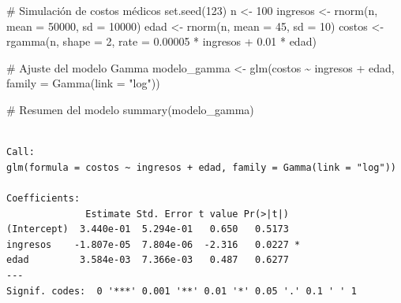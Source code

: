 \documentclass[
  letterpaper,
  DIV=11,
  numbers=noendperiod]{scrreprt}
\newenvironment{Shaded}{\begin{snugshade}}{\end{snugshade}}
\newcommand{\AttributeTok}[1]{\textcolor[rgb]{0.40,0.45,0.13}{#1}}
\newcommand{\CommentTok}[1]{\textcolor[rgb]{0.37,0.37,0.37}{#1}}
\newcommand{\DecValTok}[1]{\textcolor[rgb]{0.68,0.00,0.00}{#1}}
\newcommand{\FloatTok}[1]{\textcolor[rgb]{0.68,0.00,0.00}{#1}}
\newcommand{\FunctionTok}[1]{\textcolor[rgb]{0.28,0.35,0.67}{#1}}
\newcommand{\NormalTok}[1]{\textcolor[rgb]{0.00,0.23,0.31}{#1}}
\newcommand{\OtherTok}[1]{\textcolor[rgb]{0.00,0.23,0.31}{#1}}
\newcommand{\SpecialCharTok}[1]{\textcolor[rgb]{0.37,0.37,0.37}{#1}}
\newcommand{\StringTok}[1]{\textcolor[rgb]{0.13,0.47,0.30}{#1}}
\begin{document}
\begin{tcolorbox}[enhanced jigsaw, leftrule=.75mm, breakable, colbacktitle=quarto-callout-tip-color!10!white, bottomrule=.15mm, colframe=quarto-callout-tip-color-frame, toprule=.15mm, colback=white, coltitle=black, bottomtitle=1mm, left=2mm, title=\textcolor{quarto-callout-tip-color}{\faLightbulb}\hspace{0.5em}{Ejemplo}, opacityback=0, arc=.35mm, opacitybacktitle=0.6, toptitle=1mm, titlerule=0mm, rightrule=.15mm]

\begin{Shaded}
\begin{Highlighting}[]
\CommentTok{\# Simulación de costos médicos}
\FunctionTok{set.seed}\NormalTok{(}\DecValTok{123}\NormalTok{)}
\NormalTok{n }\OtherTok{\textless{}{-}} \DecValTok{100}
\NormalTok{ingresos }\OtherTok{\textless{}{-}} \FunctionTok{rnorm}\NormalTok{(n, }\AttributeTok{mean =} \DecValTok{50000}\NormalTok{, }\AttributeTok{sd =} \DecValTok{10000}\NormalTok{)}
\NormalTok{edad }\OtherTok{\textless{}{-}} \FunctionTok{rnorm}\NormalTok{(n, }\AttributeTok{mean =} \DecValTok{45}\NormalTok{, }\AttributeTok{sd =} \DecValTok{10}\NormalTok{)}
\NormalTok{costos }\OtherTok{\textless{}{-}} \FunctionTok{rgamma}\NormalTok{(n, }\AttributeTok{shape =} \DecValTok{2}\NormalTok{, }\AttributeTok{rate =} \FloatTok{0.00005} \SpecialCharTok{*}\NormalTok{ ingresos }\SpecialCharTok{+} \FloatTok{0.01} \SpecialCharTok{*}\NormalTok{ edad)}

\CommentTok{\# Ajuste del modelo Gamma}
\NormalTok{modelo\_gamma }\OtherTok{\textless{}{-}} \FunctionTok{glm}\NormalTok{(costos }\SpecialCharTok{\textasciitilde{}}\NormalTok{ ingresos }\SpecialCharTok{+}\NormalTok{ edad, }\AttributeTok{family =} \FunctionTok{Gamma}\NormalTok{(}\AttributeTok{link =} \StringTok{"log"}\NormalTok{))}

\CommentTok{\# Resumen del modelo}
\FunctionTok{summary}\NormalTok{(modelo\_gamma)}
\end{Highlighting}
\end{Shaded}

\begin{verbatim}

Call:
glm(formula = costos ~ ingresos + edad, family = Gamma(link = "log"))

Coefficients:
              Estimate Std. Error t value Pr(>|t|)  
(Intercept)  3.440e-01  5.294e-01   0.650   0.5173  
ingresos    -1.807e-05  7.804e-06  -2.316   0.0227 *
edad         3.584e-03  7.366e-03   0.487   0.6277  
---
Signif. codes:  0 '***' 0.001 '**' 0.01 '*' 0.05 '.' 0.1 ' ' 1


\end{verbatim}
\end{tcolorbox}
\end{document}
